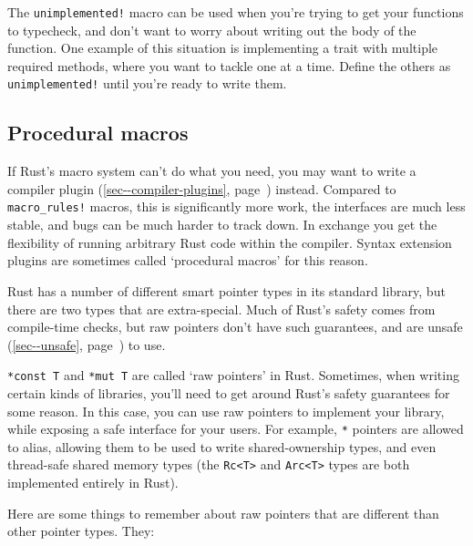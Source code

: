 \documentclass[a4paper,]{book}
\renewcommand*{\hyperref}[2][\ar]{%
  \def\ar{#2}%
  #2 (\autoref{#1}, page~\pageref{#1})}
\begin{document}
The \texttt{unimplemented!} macro can be used when you're trying to get
your functions to typecheck, and don't want to worry about writing out
the body of the function. One example of this situation is implementing
a trait with multiple required methods, where you want to tackle one at
a time. Define the others as \texttt{unimplemented!} until you're ready
to write them.

\subsection{Procedural macros}\label{procedural-macros}

If Rust's macro system can't do what you need, you may want to write a
\hyperref[sec--compiler-plugins]{compiler plugin} instead. Compared to
\texttt{macro\_rules!} macros, this is significantly more work, the
interfaces are much less stable, and bugs can be much harder to track
down. In exchange you get the flexibility of running arbitrary Rust code
within the compiler. Syntax extension plugins are sometimes called
`procedural macros' for this reason.


Rust has a number of different smart pointer types in its standard
library, but there are two types that are extra-special. Much of Rust's
safety comes from compile-time checks, but raw pointers don't have such
guarantees, and are \hyperref[sec--unsafe]{unsafe} to use.

\texttt{*const\ T} and \texttt{*mut\ T} are called `raw pointers' in
Rust. Sometimes, when writing certain kinds of libraries, you'll need to
get around Rust's safety guarantees for some reason. In this case, you
can use raw pointers to implement your library, while exposing a safe
interface for your users. For example, \texttt{*} pointers are allowed
to alias, allowing them to be used to write shared-ownership types, and
even thread-safe shared memory types (the
\texttt{Rc\textless{}T\textgreater{}} and
\texttt{Arc\textless{}T\textgreater{}} types are both implemented
entirely in Rust).

Here are some things to remember about raw pointers that are different
than other pointer types. They:
\end{document}
